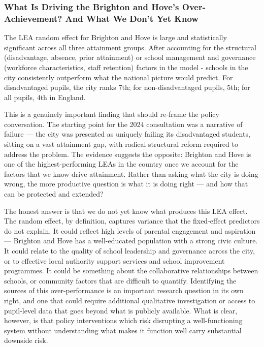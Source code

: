 \documentclass[
  12pt,
  titlepage]{article}
\begin{document}
\subsubsection{What Is Driving the Brighton and Hove's Over-Achievement?
And What We Don't Yet
Know}\label{what-is-driving-the-brighton-and-hoves-over-achievement-and-what-we-dont-yet-know}

The LEA random effect for Brighton and Hove is large and statistically
significant across all three attainment groups. After accounting for the
structural (disadvantage, absence, prior attainment) or school
management and governance (workforce characteristics, staff retention)
factors in the model - schools in the city consistently outperform what
the national picture would predict. For disadvantaged pupils, the city
ranks 7th; for non-disadvantaged pupils, 5th; for all pupils, 4th in
England.

This is a genuinely important finding that should re-frame the policy
conversation. The starting point for the 2024 consultation was a
narrative of failure --- the city was presented as uniquely failing its
disadvantaged students, sitting on a vast attainment gap, with radical
structural reform required to address the problem. The evidence suggests
the opposite: Brighton and Hove is one of the highest-performing LEAs in
the country once we account for the factors that we know drive
attainment. Rather than asking what the city is doing wrong, the more
productive question is what it is doing right --- and how that can be
protected and extended?

The honest answer is that we do not yet know what produces this LEA
effect. The random effect, by definition, captures variance that the
fixed-effect predictors do not explain. It could reflect high levels of
parental engagement and aspiration --- Brighton and Hove has a
well-educated population with a strong civic culture. It could relate to
the quality of school leadership and governance across the city, or to
effective local authority support services and school improvement
programmes. It could be something about the collaborative relationships
between schools, or community factors that are difficult to quantify.
Identifying the sources of this over-performance is an important
research question in its own right, and one that could require
additional qualitative investigation or access to pupil-level data that
goes beyond what is publicly available. What is clear, however, is that
policy interventions which risk disrupting a well-functioning system
without understanding what makes it function well carry substantial
downside risk.
\end{document}
